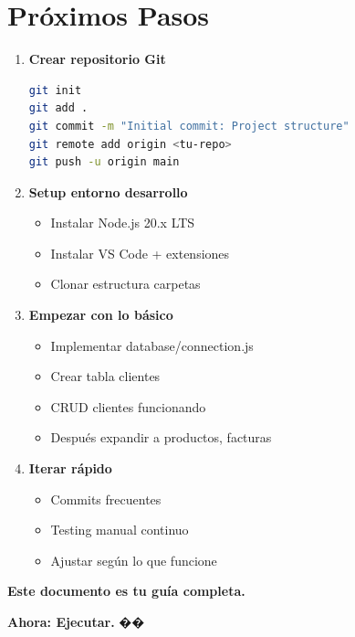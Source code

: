 \documentclass[11pt,a4paper]{article}
\begin{document}
\section{Próximos Pasos}

\begin{enumerate}
    \item \textbf{Crear repositorio Git}
    \begin{lstlisting}[language=bash]
git init
git add .
git commit -m "Initial commit: Project structure"
git remote add origin <tu-repo>
git push -u origin main
    \end{lstlisting}
    
    \item \textbf{Setup entorno desarrollo}
    \begin{itemize}
        \item Instalar Node.js 20.x LTS
        \item Instalar VS Code + extensiones
        \item Clonar estructura carpetas
    \end{itemize}
    
    \item \textbf{Empezar con lo básico}
    \begin{itemize}
        \item Implementar database/connection.js
        \item Crear tabla clientes
        \item CRUD clientes funcionando
        \item Después expandir a productos, facturas
    \end{itemize}
    
    \item \textbf{Iterar rápido}
    \begin{itemize}
        \item Commits frecuentes
        \item Testing manual continuo
        \item Ajustar según lo que funcione
    \end{itemize}
\end{enumerate}

\vspace{1cm}

\textbf{Este documento es tu guía completa.}

\textbf{Ahora: Ejecutar.} ��
\end{document}
